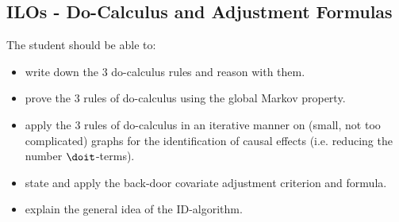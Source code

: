 \subsection*{ILOs - Do-Calculus and Adjustment Formulas}

The student should be able to:
\begin{itemize}
\item write down the 3 do-calculus rules and reason with them.
\item prove the 3 rules of do-calculus using the global Markov property.
\item apply the 3 rules of do-calculus in an iterative manner on (small, not too complicated) graphs for the identification of causal effects (i.e. reducing the number $\doit$-terms).
\item state and apply the back-door covariate adjustment criterion and formula.
\item explain the general idea of the ID-algorithm.
\end{itemize}


